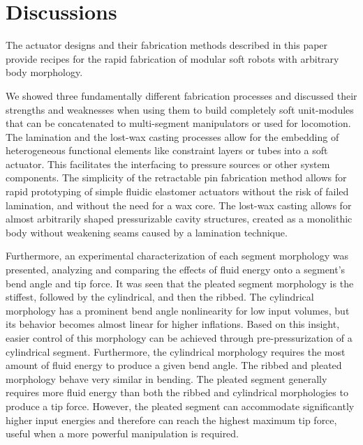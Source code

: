 \section{Discussions}
\label{sec:discussions}
The actuator designs and their fabrication methods described in this paper provide recipes for the rapid fabrication of modular soft robots with arbitrary body morphology.

We showed three fundamentally different fabrication processes and discussed their strengths and weaknesses when using them to build completely soft unit-modules that can be concatenated to multi-segment manipulators or used for locomotion.
%
The lamination and the lost-wax casting processes allow for the embedding of heterogeneous functional elements like constraint layers or tubes into a soft actuator.
This facilitates the interfacing to pressure sources or other system components. 
The simplicity of the retractable pin fabrication method allows for rapid prototyping of simple fluidic elastomer actuators without the risk of failed lamination, and without the need for a wax core.
The lost-wax casting allows for almost arbitrarily shaped pressurizable cavity structures, created as a monolithic body without weakening seams caused by a lamination technique.  

Furthermore, an experimental characterization of each segment morphology was presented, analyzing and comparing the effects of fluid energy onto a segment's bend angle and tip force. 
It was seen that the pleated segment morphology is the stiffest, followed by the cylindrical, and then the ribbed. 
The cylindrical morphology has a prominent bend angle nonlinearity for low input volumes, but its behavior becomes almost linear for higher inflations. 
Based on this insight, easier control of this morphology can be achieved through pre-pressurization of a cylindrical segment.
Furthermore, the cylindrical morphology requires the most amount of fluid energy to produce a given bend angle. 
The ribbed and pleated morphology behave very similar in bending.
The pleated segment generally requires more fluid energy than both the ribbed and cylindrical morphologies to produce a tip force. 
However, the pleated segment can accommodate significantly higher input energies and therefore can reach the highest maximum tip force, useful when a more powerful manipulation is required. 

